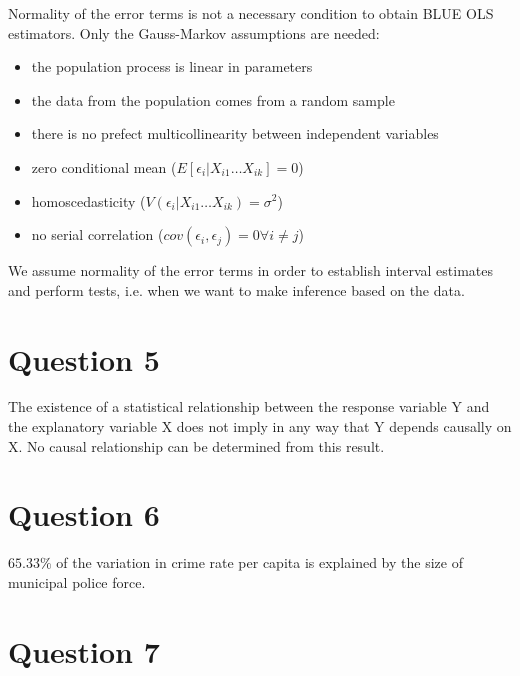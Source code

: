 \documentclass[]{article}
\begin{document}
Normality of the error terms is not a necessary condition to obtain BLUE OLS estimators. Only the Gauss-Markov assumptions are needed:

\begin{itemize}
\item the population process is linear in parameters
\item the data from the population comes from a random sample
\item there is no prefect multicollinearity between independent variables
\item zero conditional mean ($E[\epsilon_i | X_{i1} \ldots X_{ik}] = 0$)
\item homoscedasticity ($V(\epsilon_i | X_{i1} \ldots X_{ik}) = \sigma^2$)
\item no serial correlation ($cov(\epsilon_i, \epsilon_j) = 0 \forall i \neq j$)
\end{itemize}

We assume normality of the error terms in order to establish interval estimates and perform tests, i.e. when we want to make inference based on the data.

\section*{Question 5}

The existence of a statistical relationship between the response variable Y and the explanatory variable X does not imply in any way that Y depends causally on X. No causal relationship can be determined from this result.

\section*{Question 6}

$65.33\%$ of the variation in crime rate per capita is explained by the size of municipal police force.

\section*{Question 7}
\end{document}
